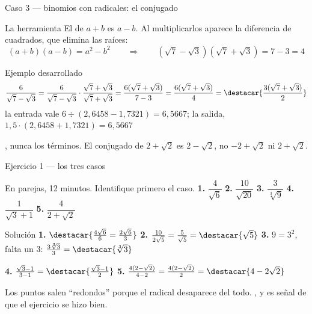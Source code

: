 \documentclass[aspectratio=169,10pt]{beamer}
\begin{document}
\begin{frame}{Caso 3 — binomios con radicales: el conjugado}
  \scriptsize
  \begin{block}{La herramienta}
    \tiny
    El  de $a+b$ es $a-b$. Al multiplicarlos aparece la
    diferencia de cuadrados, que elimina las raíces:
    \[ (a+b)(a-b) = a^{2}-b^{2}
       \qquad\Longrightarrow\qquad
       (\sqrt{7}-\sqrt{3})(\sqrt{7}+\sqrt{3}) = 7-3 = 4 \]
  \end{block}

  \vspace{0.1cm}
  \begin{exampleblock}{Ejemplo desarrollado}
    \tiny
    \[ \frac{6}{\sqrt{7}-\sqrt{3}}
     = \frac{6}{\sqrt{7}-\sqrt{3}}\cdot
       \frac{\sqrt{7}+\sqrt{3}}{\sqrt{7}+\sqrt{3}}
     = \frac{6(\sqrt{7}+\sqrt{3})}{7-3}
     = \frac{6(\sqrt{7}+\sqrt{3})}{4}
     = \destacar{\frac{3(\sqrt{7}+\sqrt{3})}{2}} \]
     la entrada vale $6\div(2{,}6458-1{,}7321)
    = 6{,}5667$; la salida, $1{,}5\cdot(2{,}6458+1{,}7321) = 6{,}5667$
    \checkmark
  \end{exampleblock}

  \vspace{0.06cm}
  {\tiny\color{uniGris} , nunca los términos. El conjugado de $2+\sqrt{2}$ es $2-\sqrt{2}$, no
  $-2+\sqrt{2}$ ni $2+\sqrt{2}$.}
\end{frame}

\begin{frame}{Ejercicio 1 — los tres casos}
  \scriptsize
  \begin{alertblock}{En parejas, 12 minutos. Identifique primero el caso.}
    \tiny
    \textbf{1.} $\dfrac{4}{\sqrt{6}}$ \qquad
    \textbf{2.} $\dfrac{10}{\sqrt{20}}$ \qquad
    \textbf{3.} $\dfrac{3}{\sqrt[3]{9}}$ \qquad
    \textbf{4.} $\dfrac{1}{\sqrt{3}+1}$ \qquad
    \textbf{5.} $\dfrac{4}{2+\sqrt{2}}$
  \end{alertblock}

  \vspace{0.05cm}
  \begin{block}{Solución}
    \tiny
    \textbf{1.} $\destacar{\tfrac{4\sqrt{6}}{6}
    = \tfrac{2\sqrt{6}}{3}}$ \qquad
    \textbf{2.} $\tfrac{10}{2\sqrt5} = \tfrac{5}{\sqrt5}
    = \destacar{\sqrt{5}}$ \qquad
    \textbf{3.} $9=3^{2}$, falta un $3$:
    $\tfrac{3\sqrt[3]{3}}{3} = \destacar{\sqrt[3]{3}}$

    \vspace{0.08cm}
    \textbf{4.} $\tfrac{\sqrt3-1}{3-1}
    = \destacar{\tfrac{\sqrt{3}-1}{2}}$ \qquad
    \textbf{5.} $\tfrac{4(2-\sqrt2)}{4-2}
    = \tfrac{4(2-\sqrt2)}{2} = \destacar{4-2\sqrt{2}}$
  \end{block}

  \vspace{0.05cm}
  {\tiny\color{uniGris} Los puntos  salen ``redondos'' porque
  el radical desaparece del todo. , y
  es señal de que el ejercicio se hizo bien.}
\end{frame}
\end{document}
